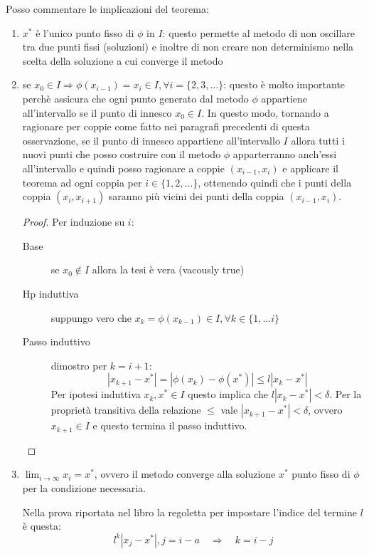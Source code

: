 \begin{oss}
Posso commentare le implicazioni del teorema:
\begin{enumerate}
  \item $x^{*}$ \`e l'unico punto fisso di $\phi$ in $I$: questo permette al
  metodo di non oscillare tra due punti fissi (soluzioni) e inoltre di non
  creare non determinismo nella scelta della soluzione a cui converge il metodo
  \item se $x_{0} \in I \Rightarrow \phi(x_{i-1}) = x_{i} \in I, \forall i =
  \{2, 3, \ldots\}$: questo \`e molto importante perch\`e assicura che ogni
  punto generato dal metodo $\phi$ appartiene all'intervallo se il punto di
  innesco $x_{0} \in I$. In questo modo, tornando a ragionare per coppie come
  fatto nei paragrafi precedenti di questa osservazione, se il punto di innesco
  appartiene all'intervallo $I$ allora tutti i nuovi punti che posso costruire
  con il metodo $\phi$ apparterranno anch'essi all'intervallo e quindi posso 
  ragionare a coppie $(x_{i-1}, x_{i})$ e applicare il teorema ad ogni coppia
  per $i \in \{ 1, 2,\ldots \}$, ottenendo quindi che i punti della coppia
  $(x_{i}, x_{i+1})$ saranno pi\`u vicini dei punti della coppia $(x_{i-1},
  x_{i})$.
  \begin{proof}
  	Per induzione su $i$: 
  	\begin{description}
  	  \item[Base] se $x_{0} \not \in I$ allora la tesi \`e vera (vacously true)
  	  \item[Hp induttiva] suppungo vero che $x_{k} = \phi(x_{k-1})\in I, \forall
  	  k \in \{1, \ldots i\}$
  	  \item[Passo induttivo] dimostro per $k = i + 1$:
  	  \begin{displaymath}
  	  	|x_{k+1} - x^{*} | = |\phi(x_{k}) - \phi(x^{*} ) | \leq l |x_{k} - x^{*} | 
  	  \end{displaymath}
  	  Per ipotesi induttiva $x_{k}, x^{*} \in I$ questo implica che $l |x_{k} -
  	  x^{*}| < \delta$. Per la propriet\`a transitiva della relazione $\leq$ vale
  	  $|x_{k+1} - x^{*} | < \delta$, ovvero $x_{k+1} \in I$ e questo termina il
  	  passo induttivo.
  	\end{description}
  \end{proof}
  
  \item $\lim_{i \rightarrow \infty}{x_{i}} = x^{*}$, ovvero il metodo converge
  alla soluzione $x^{*}$ punto fisso di $\phi$ per la condizione necessaria.
  
  Nella prova riportata nel libro la regoletta per impostare l'indice del
  termine $l$ \`e questa: 
  \begin{displaymath}
  	l^{k}|x_{j } - x^{*}|, j = i - a \quad \Rightarrow \quad k = i - j
  \end{displaymath}
\end{enumerate}
\end{oss}

